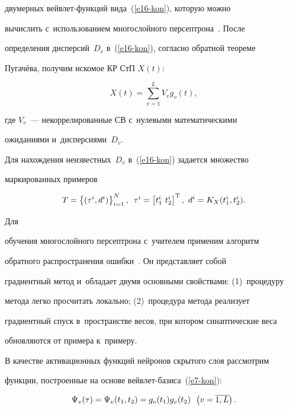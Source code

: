 двумерных вейв\-лет-функ\-ций вида~(\ref{e16-kon}), которую можно 


вычислить с~использованием многослойного персептрона~\cite{17-kon}. После 


определения дисперсий~$D_v$ в~(\ref{e16-kon}), согласно обратной теореме 


Пугачёва, получим искомое КР СтП $X(t)$:


\begin{equation}


X(t)= \sum\limits^L_{v=1} V_v g_v(t),


\label{e17-kon}


\end{equation}


где $V_v$~--- некоррелированные СВ с~нулевыми математическими 


ожиданиями и~дисперсиями~$D_v$.


  


  Для нахождения неизвестных~$D_v$ в~(\ref{e16-kon}) задается множество 


маркированных примеров 


$$


T= \left\{ (\tau^i, d^i)\right\}^N_{i=1},\enskip 


\tau^i= \left[ t_1^i\ t_2^i\right]^{\mathrm{T}},\ d^i= K_X(t_1^i, t_2^i).


$$





 Для 


обучения многослойного персептрона с~учителем применим алгоритм 


обратного распространения ошибки~\cite{17-kon}. Он представляет собой 


градиентный метод и~обладает двумя основными свойствами: (1)~процедуру 


метода легко просчитать локально; (2)~процедура метода реализует 


градиентный спуск в~пространстве весов, при котором синаптические веса 


обновляются от примера к~примеру. 


  


  В качестве активационных функций нейронов скрытого слоя рассмотрим 


функции, построенные на основе вейв\-лет-ба\-зи\-са~(\ref{e7-kon}):


  \begin{equation*}


  \Psi_v(\tau) =\Psi_v(t_1,t_2) =g_v(t_1) g_v(t_2)\enskip \left( 


v=\overline{1,L}\right).




  \end{equation*}


